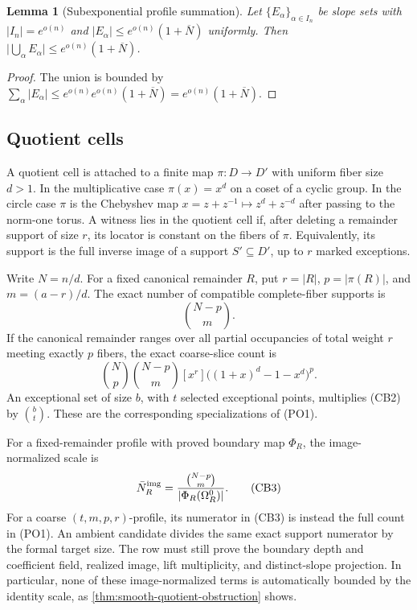 \documentclass[12pt,a4paper]{amsart}
\numberwithin{equation}{section}
\newtheorem{lemma}[lemma]{Lemma}
\theoremstyle{remark}
\newcommand{\barN}{\overline N}
\newcommand{\abs}[1]{\lvert #1\rvert}
\begin{document}
\begin{lemma}[Subexponential profile summation]\label{lem:profile-summation}
Let \(\{E_\alpha\}_{\alpha\in I_n}\) be slope sets with
\(\abs{I_n}=e^{o(n)}\) and
\(\abs{E_\alpha}\le e^{o(n)}(1+\barN)\) uniformly.  Then
\(\abs{\bigcup_{\alpha}E_\alpha}\le e^{o(n)}(1+\barN)\).
\end{lemma}

\begin{proof}
The union is bounded by
\(\sum_\alpha\abs{E_\alpha}\le
e^{o(n)}e^{o(n)}(1+\barN)=e^{o(n)}(1+\barN)\).
\end{proof}

\subsection*{Quotient cells}
A quotient cell is attached to a finite map \(\pi:D\to D'\) with uniform fiber size \(d>1\).  In the multiplicative case \(\pi(x)=x^d\) on a coset of a cyclic group.  In the circle case \(\pi\) is the Chebyshev map \(x=z+z^{-1}\mapsto z^d+z^{-d}\) after passing to the norm-one torus.  A witness lies in the quotient cell if, after deleting a remainder support of size \(r\), its locator is constant on the fibers of \(\pi\).  Equivalently, its support is the full inverse image of a support \(S'\subseteq D'\), up to \(r\) marked exceptions.

Write \(N=n/d\).  For a fixed canonical remainder \(R\), put
\(r=\abs R\), \(p=\abs{\pi(R)}\), and \(m=(a-r)/d\).  The exact number
of compatible complete-fiber supports is
\[
                         \binom{N-p}{m}.              \tag{CB1}
\]
If the canonical remainder ranges over all partial occupancies of total
weight \(r\) meeting exactly \(p\) fibers, the exact coarse-slice count is
\[
 \binom Np\binom{N-p}m
 [x^r]\bigl((1+x)^d-1-x^d\bigr)^p.                  \tag{CB2}
\]
An exceptional set of size \(b\), with \(t\) selected exceptional points,
multiplies \textup{(CB2)} by \(\binom bt\).  These are the corresponding
specializations of \textup{(PO1)}.

For a fixed-remainder profile with proved boundary map \(\Phi_R\), the
image-normalized scale is
\[
 \bar N_R^{\rm img}
 =\frac{\binom{N-p}{m}}
        {\abs{\Phi_R(\Omega_R^0)}}.                  \tag{CB3}
\]
For a coarse \((t,m,p,r)\)-profile, its numerator in \textup{(CB3)} is
instead the full count in \textup{(PO1)}.  An ambient candidate divides
the same exact support numerator by the formal target size.  The row must
still prove the boundary depth and coefficient field, realized image,
lift multiplicity, and distinct-slope projection.  In particular, none of
these image-normalized terms is automatically bounded by the identity
scale, as \cref{thm:smooth-quotient-obstruction} shows.
\end{document}
